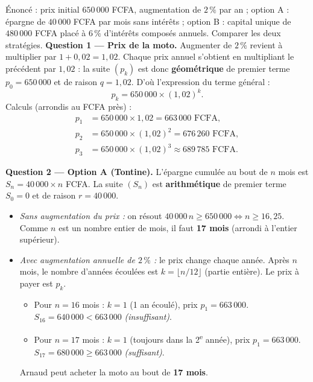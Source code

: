 \documentclass[11pt]{article}
\begin{document}
\begin{exoresolu}
Énoncé : prix initial $650\,000$ FCFA, augmentation de $2\,\%$ par an ; option A : épargne de $40\,000$ FCFA par mois sans intérêts ; option B : capital unique de $480\,000$ FCFA placé à $6\,\%$ d'intérêts composés annuels. Comparer les deux stratégies.
\tcblower
\textbf{Question 1 — Prix de la moto.}
Augmenter de $2\,\%$ revient à multiplier par $1 + 0{,}02 = 1{,}02$.
Chaque prix annuel s'obtient en multipliant le précédent par $1{,}02$ : la suite $(p_k)$ est donc \textbf{géométrique} de premier terme $p_0 = 650\,000$ et de raison $q = 1{,}02$.
D'où l'expression du terme général :
\[ p_k = 650\,000 \times (1{,}02)^k. \]
Calculs (arrondis au FCFA près) :
\begin{align*}
p_1 &= 650\,000 \times 1{,}02 = 663\,000 \text{ FCFA},\\
p_2 &= 650\,000 \times (1{,}02)^2 = 676\,260 \text{ FCFA},\\
p_3 &= 650\,000 \times (1{,}02)^3 \approx 689\,785 \text{ FCFA}.
\end{align*}

\textbf{Question 2 — Option A (Tontine).}
L'épargne cumulée au bout de $n$ mois est $S_n = 40\,000 \times n$ FCFA.
La suite $(S_n)$ est \textbf{arithmétique} de premier terme $S_0 = 0$ et de raison $r = 40\,000$.

\begin{itemize}
\item \textit{Sans augmentation du prix :} on résout $40\,000\,n \geq 650\,000 \iff n \geq 16{,}25$.
Comme $n$ est un nombre entier de mois, il faut \textbf{17 mois} (arrondi à l'entier supérieur).
\item \textit{Avec augmentation annuelle de $2\,\%$ :} le prix change chaque année.
Après $n$ mois, le nombre d'années écoulées est $k = \lfloor n/12 \rfloor$ (partie entière). Le prix à payer est $p_k$.
\begin{itemize}
\item Pour $n = 16$ mois : $k=1$ (1 an écoulé), prix $p_1 = 663\,000$. $S_{16} = 640\,000 < 663\,000$ \textit{(insuffisant)}.
\item Pour $n = 17$ mois : $k=1$ (toujours dans la 2\textsuperscript{e} année), prix $p_1 = 663\,000$. $S_{17} = 680\,000 \geq 663\,000$ \textit{(suffisant)}.
\end{itemize}
Arnaud peut acheter la moto au bout de \textbf{17 mois}.
\end{itemize}


\end{exoresolu}
\end{document}
